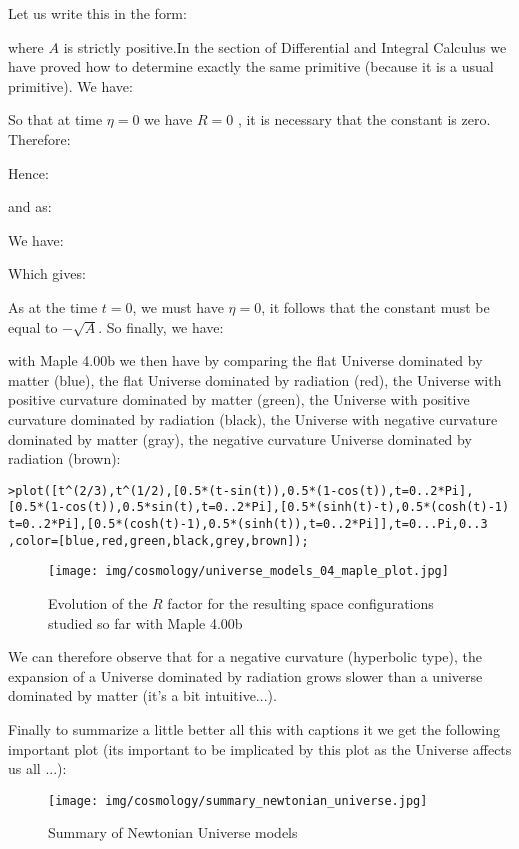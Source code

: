 	Let us write this in the form:
	
	where $A$ is strictly positive.In the section of Differential and Integral Calculus we have proved how to determine exactly the same primitive (because it is a usual primitive). We have:
	
	So that at time $\eta=0$ we have $R=0$ , it is necessary that the constant is zero. Therefore:
	
	Hence:
	
	and as:
	
	We have:
	
	Which gives:
	
	As at the time $t=0$, we must have $\eta=0$, it follows that the constant must be equal to $-\sqrt{A}$. So finally, we have:
	
	with Maple 4.00b we then have by comparing the flat Universe dominated by matter (blue), the flat Universe dominated by radiation (red), the Universe with positive curvature dominated by matter (green), the Universe with positive curvature dominated by radiation (black), the Universe with negative curvature dominated by matter (gray), the negative curvature Universe dominated by radiation (brown):
	
	\texttt{>plot([t\string^(2/3),t\string^(1/2),[0.5*(t-sin(t)),0.5*(1-cos(t)),t=0..2*Pi],}\\
	\texttt{[0.5*(1-cos(t)),0.5*sin(t),t=0..2*Pi],[0.5*(sinh(t)-t),0.5*(cosh(t)-1)}\\
	\texttt{t=0..2*Pi],[0.5*(cosh(t)-1),0.5*(sinh(t)),t=0..2*Pi]],t=0...Pi,0..3
,color=[blue,red,green,black,grey,brown]);}
	\begin{figure}[H]
		\centering
		\texttt{[image: img/cosmology/universe\_models\_04\_maple\_plot.jpg]}
		\caption[]{Evolution of the $R$ factor for the resulting space configurations studied so far with Maple 4.00b}
	\end{figure}
	We can therefore observe that for a negative curvature (hyperbolic type), the expansion of a Universe dominated by radiation grows slower than a universe dominated by matter (it's a bit intuitive...).

	Finally to summarize a little better all this with captions it we get the following important plot (its important to be implicated by this plot as the Universe affects us all ...):
	\begin{figure}[H]
		\centering
		\texttt{[image: img/cosmology/summary\_newtonian\_universe.jpg]}
		\caption{Summary of Newtonian Universe models}
	\end{figure}
	
